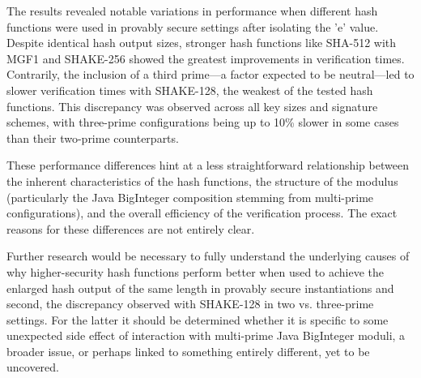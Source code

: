\documentclass[]{final_report}
\theoremstyle{definition}
\begin{document}
The results revealed notable variations in performance when different hash functions were used in provably secure settings  after isolating the 'e' value. Despite identical hash output sizes, stronger hash functions like SHA-512 with MGF1 and SHAKE-256 showed the greatest improvements in verification times. Contrarily, the inclusion of a third prime—a factor expected to be neutral—led to slower verification times with SHAKE-128, the weakest of the tested hash functions. This discrepancy was observed across all key sizes and signature schemes, with three-prime configurations being up to 10\% slower in some cases than their two-prime counterparts.


These performance differences hint at a less straightforward relationship between the inherent characteristics of the hash functions, the structure of the modulus (particularly the Java BigInteger composition stemming from multi-prime configurations), and the overall efficiency of the verification process. The exact reasons for these differences are not entirely clear. 

Further research would be necessary to fully understand the underlying causes of why higher-security hash functions perform better when used to achieve the enlarged hash output of the same length in provably secure instantiations and second, the discrepancy observed with SHAKE-128 in two vs. three-prime settings. For the latter it should be determined whether it is specific to some unexpected side effect of interaction with multi-prime Java BigInteger moduli, a broader issue, or perhaps linked to something entirely different, yet to be uncovered. 
\end{document}
